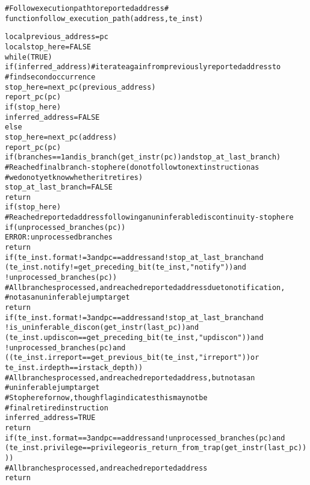 \pagebreak

\begin{alltt}
# Follow execution path to reported address #
function follow_execution_path(address, te_inst)

  local previous_address = pc
  local stop_here        = FALSE
  while (TRUE)
    if (inferred_address) # iterate again from previously reported address to
                          #   find second occurrence
      stop_here = next_pc(previous_address)
      report_pc(pc)
      if (stop_here)
        inferred_address = FALSE
    else
      stop_here = next_pc(address)
      report_pc(pc)
      if (branches == 1 and is_branch(get_instr(pc)) and stop_at_last_branch)
        # Reached final branch - stop here (do not follow to next instruction as
        #  we do not yet know whether it retires)
        stop_at_last_branch = FALSE
        return
      if (stop_here)
        # Reached reported address following an uninferable discontinuity - stop here
        if (unprocessed_branches(pc))
          ERROR: unprocessed branches
        return
      if (te_inst.format != 3 and pc == address and !stop_at_last_branch and
        (te_inst.notify != get_preceding_bit(te_inst, "notify")) and 
        !unprocessed_branches(pc))
          # All branches processed, and reached reported address due to notification,
          # not as an uninferable jump target
        return
      if (te_inst.format != 3 and pc == address and !stop_at_last_branch and
        !is_uninferable_discon(get_instr(last_pc)) and 
        (te_inst.updiscon == get_preceding_bit(te_inst, "updiscon")) and 
        !unprocessed_branches(pc) and
        ((te_inst.irreport == get_previous_bit(te_inst, "irreport")) or 
         te_inst.irdepth == irstack_depth))
          # All branches processed, and reached reported address, but not as an
          #   uninferable jump target
          # Stop here for now, though flag indicates this may not be
          #  final retired instruction
        inferred_address = TRUE
        return
      if (te_inst.format == 3 and pc == address and !unprocessed_branches(pc) and
        (te_inst.privilege == privilege or is_return_from_trap(get_instr(last_pc))))
        # All branches processed, and reached reported address
        return
\end{alltt}

\pagebreak

